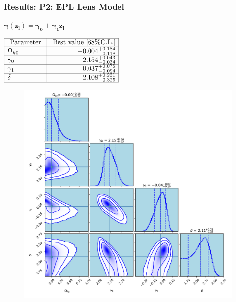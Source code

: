 \documentclass[xcolor=table,bigger]{beamer}
\begin{document}
\begin{frame}
 \frametitle{Results: \textbf{ P2: EPL} Lens Model}
\begin{large}

$
{\boxed{\boldsymbol{\gamma(z_l)=\gamma_0+\gamma_1 z_l}}}
$
\end{large}\hspace*{1cm}$\begin{array}{|l|r|}\hline \text { Parameter } & {\text { Best value }[68 \% \mathrm{C.L.}]} \\ \hline \Omega_{k 0} & {-0.004^{+0.184}_{-0.118}} \\ \hline \gamma_{0} & {2.154^{+0.043}_{-0.034}} \\ \hline \gamma_{1} & {-0.037^{+0.075}_{-0.094}} \\ \hline \delta & {2.108^{+0.221}_{-0.325}} \\ \hline\end{array}$
\begin{figure}[ht!]
\centering
\includegraphics[width=52 mm]{distance_Ratio_161_ok_1_ga0_ga1_delt_P2_corner_without_beta_h0_decc}
\end{figure} 
\end{frame}
\end{document}
